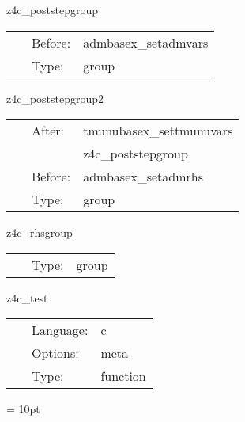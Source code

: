 
\hspace{5mm} z4c\_poststepgroup 

\hspace{5mm}{\it post-process z4c variables } 


\hspace{5mm}

 \begin{tabular*}{160mm}{cll} 
~ & Before:  & admbasex\_setadmvars \\ 
~ & Type:  & group \\ 
\end{tabular*} 


\vspace{5mm}


\hspace{5mm} z4c\_poststepgroup2 

\hspace{5mm}{\it post-process z4c variables, part 2 } 


\hspace{5mm}

 \begin{tabular*}{160mm}{cll} 
~ & After:  & tmunubasex\_settmunuvars \\ 
~& ~ &z4c\_poststepgroup\\ 
~ & Before:  & admbasex\_setadmrhs \\ 
~ & Type:  & group \\ 
\end{tabular*} 


\vspace{5mm}


\hspace{5mm} z4c\_rhsgroup 

\hspace{5mm}{\it calculate z4c rhs } 


\hspace{5mm}

 \begin{tabular*}{160mm}{cll} 
~ & Type:  & group \\ 
\end{tabular*} 


\vspace{5mm}


\hspace{5mm} z4c\_test 

\hspace{5mm}{\it self-test } 


\hspace{5mm}

 \begin{tabular*}{160mm}{cll} 
~ & Language:  & c \\ 
~ & Options:  & meta \\ 
~ & Type:  & function \\ 
\end{tabular*} 



\vspace{5mm}\parskip = 10pt 

